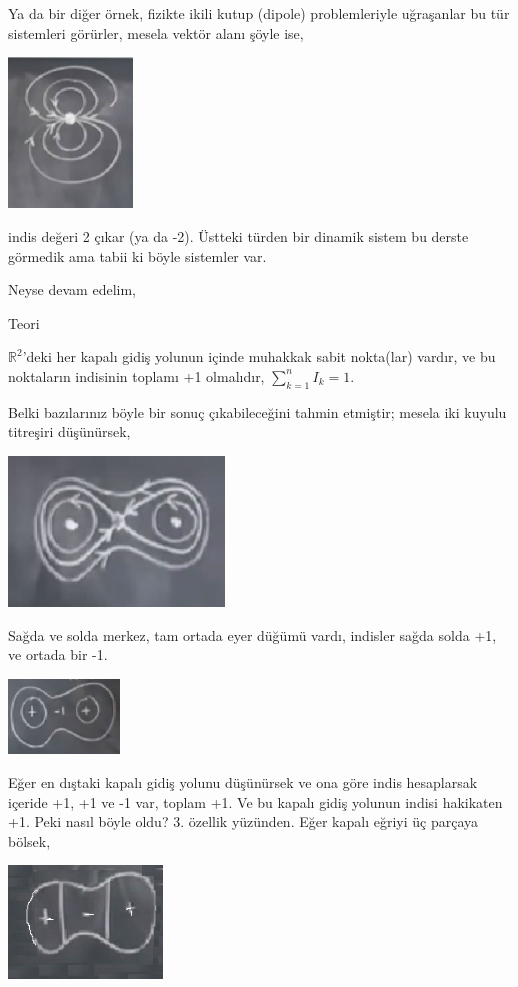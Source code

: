 \documentclass[12pt,fleqn]{article}\usepackage{../../common}
\begin{document}
Ya da bir diğer örnek, fizikte ikili kutup (dipole) problemleriyle uğraşanlar bu
tür sistemleri görürler, mesela vektör alanı şöyle ise,

\includegraphics[height=4cm]{08_31.png}

indis değeri 2 çıkar (ya da -2). Üstteki türden bir dinamik sistem bu derste
görmedik ama tabii ki böyle sistemler var. 

Neyse devam edelim,

Teori

$\mathbb{R}^2$'deki her kapalı gidiş yolunun içinde muhakkak sabit nokta(lar)
vardır, ve bu noktaların indisinin toplamı +1 olmalıdır, $\sum _{k=1}^{n} I_k =
1$.

Belki bazılarınız böyle bir sonuç çıkabileceğini tahmin etmiştir; mesela iki
kuyulu titreşiri düşünürsek,

\includegraphics[height=4cm]{08_32.png}

Sağda ve solda merkez, tam ortada eyer düğümü vardı, indisler sağda solda +1,
ve ortada bir -1.

\includegraphics[height=2cm]{08_33.png}

Eğer en dıştaki kapalı gidiş yolunu düşünürsek ve ona göre indis hesaplarsak
içeride +1, +1 ve -1 var, toplam +1. Ve bu kapalı gidiş yolunun indisi
hakikaten +1. Peki nasıl böyle oldu? 3. özellik yüzünden. Eğer kapalı eğriyi üç
parçaya bölsek, 

\includegraphics[height=3cm]{08_34.png}
\end{document}
